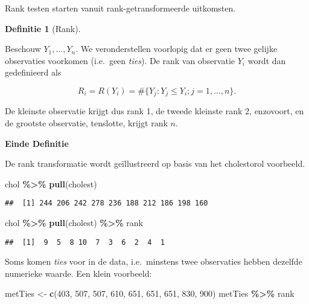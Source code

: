 \documentclass[
  12pt,dutch,coursenotes]{book}
\newenvironment{Shaded}{\begin{snugshade}}{\end{snugshade}}
\newcommand{\DecValTok}[1]{\textcolor[rgb]{0.00,0.00,0.81}{#1}}
\newcommand{\KeywordTok}[1]{\textcolor[rgb]{0.13,0.29,0.53}{\textbf{#1}}}
\newcommand{\NormalTok}[1]{#1}
\newcommand{\OperatorTok}[1]{\textcolor[rgb]{0.81,0.36,0.00}{\textbf{#1}}}
\newcommand{\StringTok}[1]{\textcolor[rgb]{0.31,0.60,0.02}{#1}}
\theoremstyle{definition}
\newtheorem{definition}{Definitie}[chapter]
\theoremstyle{definition}
\theoremstyle{definition}
\theoremstyle{remark}
\begin{document}
Rank testen starten vanuit rank-getransformeerde uitkomsten.

\begin{definition}[Rank]
\protect\hypertarget{def:unnamed-chunk-207}{}{\label{def:unnamed-chunk-207} \iffalse (Rank) \fi{} }
\end{definition}
Beschouw \(Y_1, \ldots, Y_n\). We veronderstellen voorlopig dat
er geen twee gelijke observaties voorkomen (i.e.~geen \emph{ties}).
De rank van observatie \(Y_i\) wordt dan
gedefinieerd als

\begin{equation*}
  R_i=R(Y_i) = \#\{Y_j: Y_j\leq Y_i; j=1,\ldots, n\}.
\end{equation*}

De kleinste observatie krijgt dus rank 1, de tweede kleinste rank 2, enzovoort, en de grootste observatie,
tenslotte, krijgt rank \(n\).

\textbf{Einde Definitie}

De rank transformatie wordt geïllustreerd op basis van het cholestorol voorbeeld.

\begin{Shaded}
\begin{Highlighting}[]
\NormalTok{chol }\OperatorTok{\%\textgreater{}\%}\StringTok{ }\KeywordTok{pull}\NormalTok{(cholest)}
\end{Highlighting}
\end{Shaded}

\begin{verbatim}
##  [1] 244 206 242 278 236 188 212 186 198 160
\end{verbatim}

\begin{Shaded}
\begin{Highlighting}[]
\NormalTok{chol }\OperatorTok{\%\textgreater{}\%}\StringTok{ }\KeywordTok{pull}\NormalTok{(cholest) }\OperatorTok{\%\textgreater{}\%}\StringTok{ }\NormalTok{rank}
\end{Highlighting}
\end{Shaded}

\begin{verbatim}
##  [1]  9  5  8 10  7  3  6  2  4  1
\end{verbatim}

Soms komen \emph{ties} voor in de data, i.e.~minstens twee observaties hebben dezelfde numerieke waarde. Een klein voorbeeld:

\begin{Shaded}
\begin{Highlighting}[]
\NormalTok{metTies \textless{}{-}}\StringTok{ }\KeywordTok{c}\NormalTok{(}\DecValTok{403}\NormalTok{, }\DecValTok{507}\NormalTok{, }\DecValTok{507}\NormalTok{, }\DecValTok{610}\NormalTok{, }\DecValTok{651}\NormalTok{, }\DecValTok{651}\NormalTok{, }\DecValTok{651}\NormalTok{, }\DecValTok{830}\NormalTok{, }
    \DecValTok{900}\NormalTok{)}
\NormalTok{metTies }\OperatorTok{\%\textgreater{}\%}\StringTok{ }\NormalTok{rank}
\end{Highlighting}
\end{Shaded}
\end{document}
